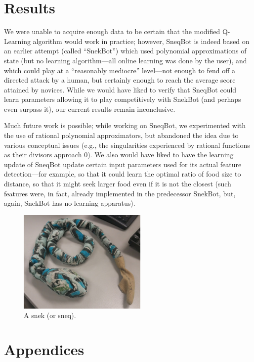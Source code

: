 \documentclass{article}
\begin{document}
\section{Results}

	We were unable to acquire enough data to be certain that the modified
	Q-Learning algorithm would work in practice; however, SneqBot is indeed
	based on an earlier attempt (called ``SnekBot'') which used polynomial
	approximations of state (but no learning algorithm---all online learning
	was done by the user), and which could play at a ``reasonably mediocre''
	level---not enough to fend off a directed attack by a human, but certainly
	enough to reach the average score attained by novices. While we would have
	liked to verify that SneqBot could learn parameters allowing it to play
	competitively with SnekBot (and perhaps even surpass it), our current
	results remain inconclusive.

	Much future work is possible; while working on SneqBot, we experimented
	with the use of rational polynomial approximators, but abandoned the idea
	due to various conceptual issues (e.g., the singularities experienced by
	rational functions as their divisors approach 0). We also would have liked
	to have the learning update of SneqBot update certain input parameters used
	for its actual feature detection---for example, so that it could learn the
	optimal ratio of food size to distance, so that it might seek larger food
	even if it is not the closest (such features were, in fact, already
	implemented in the predecessor SnekBot, but, again, SnekBot has no learning
	apparatus).

	\begin{figure}[b]
		\caption{A snek (or sneq).}
		\centering
		\includegraphics[height=5cm]{snek.jpg}
	\end{figure}

\section{Appendices}
\end{document}
